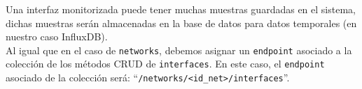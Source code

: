 \documentclass[a4paper, oneside, 12pt]{book}
\begin{document}
	\noindent Una interfaz monitorizada puede tener muchas muestras guardadas en el sistema, dichas muestras serán almacenadas en la base de datos para datos temporales (en nuestro caso InfluxDB). \\
	
	\noindent Al igual que en el caso de \texttt{networks}, debemos asignar un \texttt{endpoint} asociado a la colección de los métodos CRUD de \texttt{interfaces}. En este caso, el \texttt{endpoint} asociado de la colección será: ``\texttt{/networks/<id\_net>/interfaces}''. \\
	
	\begin{table}[h!]
		\centering
\end{table}
\end{document}
